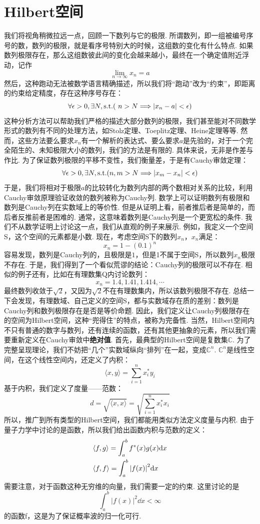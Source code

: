 \section{Hilbert空间}
我们将视角稍微拉远一点，回顾一下数列与它的极限. 所谓数列，即一组被编号序号的数，数列的极限，就是看序号特别大的时候，这组数的变化有什么特点. 如果数列极限存在，那么这组数彼此间的变化会越来越小，最终在一个确定值附近浮动，记作
\[
\lim_{n\to\infty}x_{n} = a
\]
然后，这种跑动无法被数学语言精确描述，所以我们将“跑动”改为“约束”，即距离的约束给定精度，存在这种序号存在：
\[
\forall\epsilon > 0, \exists N,\mathrm{s.t.}(\ n>N\Longrightarrow \abs{x_{n}-a}<\epsilon)
\]
这种分析方法可以帮助我们严格的描述大部分数列的极限，我们甚至能对不同数学形式的数列有不同的处理方法，如Stolz定理、Toeplitz定理、Heine定理等等. 然而，这些方法要么要求\(x_{n}\)有一个解析的表达式、要么要求\(a\)是先验的，对于一个完全陌生的、未知极限大小的数列，我们的方法是有限的. 具体来说，无非是作差与作比. 为了保证数列极限的平移不变性，我们衡量差，于是有Cauchy审敛定理：
\[
\forall\epsilon>0,\exists N, \mathrm{s.t.}(n,m>N\Longrightarrow\abs{x_{m}-x_{n}}<\epsilon)
\]
于是，我们将相对于极限\(a\)的比较转化为数列内部的两个数相对关系的比较，利用Cauchy审敛原理验证收敛的数列被称为Cauchy列. 数学上可以证明数列有极限和数列是Cauchy列在实数域上的等价性. 但是从证明上看，前者推后者是简单的，而后者反推前者是困难的. 通常，这意味着数列是Cauchy列是一个更宽松的条件. 我们不从数学证明上讨论这一点，我们从直观的例子来展示. 例如，我定义一个空间S，这个空间的元素都是小数. 现在，考虑空间S下的数列\(x_{n}\)，\(x_{n}\)满足：
\[
x_{n} = 1 - (0.1)^{n}
\]
容易发现，数列是Cauchy列的，且极限是\(1\)，但是1不属于空间S，所以数列\(x_{n}\)极限不存在. 于是，我们得到了一个看似荒谬的结论：Cauchy列的极限可以不存在. 相似的例子还有，比如在有理数集Q内讨论数列：
\[
x_{n} = 1.4, 1.41, 1.414, \cdots
\]
最终数列收敛于\(\sqrt{2}\)，又因为\(\sqrt{2}\)不在有理数集内，所以该数列极限不存在. 总结一下会发现，有理数域、自己定义的空间S，都与实数域存在质的差别：数列是Cauchy列和数列极限存在是否是等价命题. 因此，我们定义让Cauchy列极限存在的空间为Hilbert空间，这种“兜得住”的特点，被称为完备性. 当然，Hilbert空间内不只有普通的数字与数列，还有连续的函数，还有其他更抽象的元素，所以我们需要重新定义在Cauchy审敛中\textbf{绝对值}. 首先，最典型的Hilbert空间是复数集\(\mathbb{C}\). 为了完整呈现理论，我们不妨把“几个”实数域纵向“排列”在一起，变成\(\mathbb{C}^{n}\). \(\mathbb{C}^{n}\)是线性空间，在这个线性空间内，还定义了内积：
\[
\langle x,y\rangle = \sum_{i=1}^{n}x^*_{i}y_{i}
\]
基于内积，我们定义了度量——范数：
\[
d = \sqrt{\langle x,x\rangle} = \sqrt{\sum_{i=1}^{n}x_{i}^{*}x_{i}}
\]
所以，推广到所有类型的Hilbert空间，我们都能用类似方法定义度量与内积. 由于量子力学中讨论的是函数，所以我们给出函数内积与范数的定义：
\begin{align*}
& \langle f, g\rangle = \int_{a}^{b}f^{*}(x)g(x)\dd x \\
& \langle f, f\rangle = \int_{a}^{b}\abs{f(x)}^{2}\dd x\\
\end{align*}
需要注意，对于函数这种无穷维的向量，我们需要一定的约束. 这里讨论的是
\[
\int_{a}^{b}|f(x)|^{2}\dd x<\infty
\]
的函数f，这是为了保证概率波的归一化可行. 
